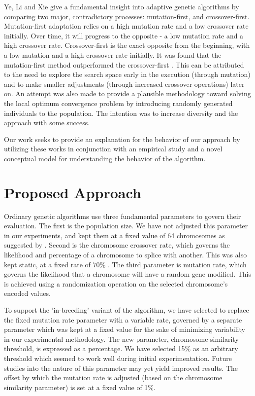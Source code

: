 \documentclass[conference]{IEEEtran}
\begin{document}
Ye, Li and Xie give a fundamental insight into adaptive genetic algorithms by comparing two major, contradictory processes: mutation-first, and crossover-first. Mutation-first adaptation relies on a high mutation rate and a low crossover rate initially. Over time, it will progress to the opposite - a low mutation rate and a high crossover rate. Crossover-first is the exact opposite from the beginning, with a low mutation and a high crossover rate initially. It was found that the mutation-first method outperformed the crossover-first \cite{ye2010some}. This can be attributed to the need to explore the search space early in the execution (through mutation) and to make smaller adjustments (through increased crossover operations) later on. An attempt was also made to provide a plausible methodology toward solving the local optimum convergence problem by introducing randomly generated individuals to the population. The intention was to increase diversity and the approach with some success. 

Our work seeks to provide an explanation for the behavior of our approach by utilizing these works in conjunction with an empirical study and a novel conceptual model for understanding the behavior of the algorithm.

\section{Proposed Approach}\label{params}
Ordinary genetic algorithms use three fundamental parameters to govern their evaluation. The first is the population size. We have not adjusted this parameter in our experiments, and kept them at a fixed value of 64 chromosomes as suggested by \cite{negnevitsky2005ai}. Second is the chromosome crossover rate, which governs the likelihood and percentage of a chromosome to splice with another. This was also kept static, at a fixed rate of 70\% \cite{negnevitsky2005ai}. The third parameter is mutation rate, which governs the likelihood that a chromosome will have a random gene modified. This is achieved using a randomization operation on the selected chromosome's encoded values.

To support the 'in-breeding' variant of the algorithm, we have selected to replace the fixed mutation rate parameter with a variable rate, governed by a separate parameter which was kept at a fixed value for the sake of minimizing variability in our experimental methodology. The new parameter, chromosome similarity threshold, is expressed as a percentage. We have selected 15\% as an arbitrary threshold which seemed to work well during initial experimentation. Future studies into the nature of this parameter may yet yield improved results. The offset by which the mutation rate is adjusted (based on the chromosome similarity parameter) is set at a fixed value of 1\%.
\end{document}
